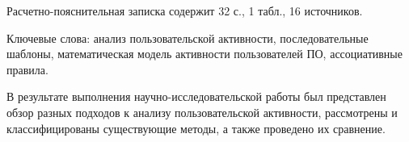 
Расчетно-пояснительная записка содержит 32 с., 1 табл., 16 источников.

Ключевые слова: анализ пользовательской активности, последовательные шаблоны, математическая модель активности пользователей ПО, ассоциативные правила.


%

В результате выполнения научно-исследовательской работы был представлен обзор разных подходов к анализу пользовательской активности, рассмотрены и классифицированы существующие методы, а также проведено их сравнение.

%
%
%

